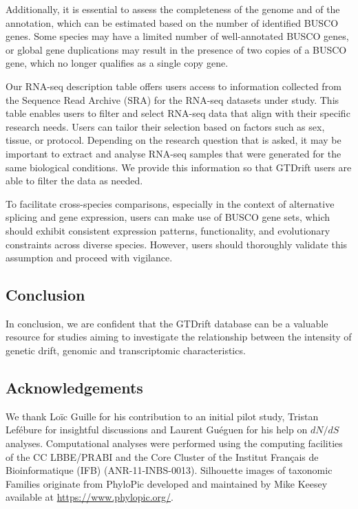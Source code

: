 Additionally, it is essential to assess the completeness of the genome and of the annotation, which can be estimated based on the number of identified \acrshort{BUSCO} genes. Some species may have a limited number of well-annotated \acrshort{BUSCO} genes, or global gene duplications may result in the presence of two copies of a \acrshort{BUSCO} gene, which no longer qualifies as a single copy gene.

Our RNA-seq description table offers users access to information collected from the Sequence Read Archive (SRA) for the RNA-seq datasets under study. This table enables users to filter and select RNA-seq data that align with their specific research needs. Users can tailor their selection based on factors such as sex, tissue, or protocol. Depending on the research question that is asked, it may be important to extract and analyse RNA-seq samples that were generated for the same biological conditions. We provide this information so that GTDrift users are able to filter the data as needed. 

To facilitate cross-species comparisons, especially in the context of alternative splicing and gene expression, users can make use of \acrshort{BUSCO} gene sets, which should exhibit consistent expression patterns, functionality, and evolutionary constraints across diverse species. However, users should thoroughly validate this assumption and proceed with vigilance.

\subsection{Conclusion}
In conclusion, we are confident that the GTDrift database can be a valuable resource for studies aiming to investigate the relationship between the intensity of genetic drift, genomic and transcriptomic characteristics.

\subsection*{Acknowledgements}
We thank Loïc Guille for his contribution to an initial pilot study, Tristan Lefébure for insightful discussions and Laurent Guéguen for his help on ${dN}/{dS}$ analyses. 
Computational analyses were performed using the computing facilities of the CC LBBE/PRABI and the Core Cluster of the Institut Français de Bioinformatique (IFB) (ANR-11-INBS-0013).
Silhouette images of taxonomic Families originate from PhyloPic developed and maintained by Mike Keesey available at \url{https://www.phylopic.org/}.

